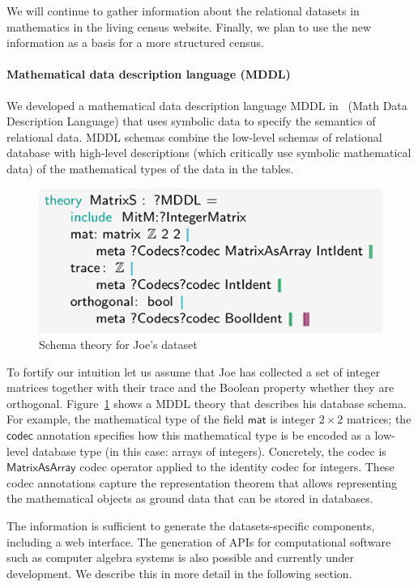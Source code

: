We will continue to gather information about the relational datasets 
in mathematics in the living census website.
Finally, we plan to use the new information as a basis for a more structured census.

\paragraph{Mathematical data description language (MDDL)}
We developed a mathematical data description language MDDL in~\cite{BerKohRab:tumdi19} (Math Data Description Language) that uses symbolic data to specify the semantics of relational data.
MDDL schemas combine the low-level schemas of relational database with high-level descriptions (which critically use symbolic mathematical data) of the mathematical types of the data in the tables.

\begin{figure}[ht]
  \includegraphics[width=.48\textwidth]{data_joe-schema}
  \caption{Schema theory for Joe's dataset}\label{fig:joe-schema}
\end{figure}

To fortify our intuition let us assume that Joe has collected a set of integer matrices together with their trace
and the Boolean property whether they are orthogonal.
Figure~\ref{fig:joe-schema} shows a MDDL theory that describes his database schema.
For example, the mathematical type of the field $\mathsf{mat}$ is integer $2\times2$ matrices;
the $\mathsf{codec}$ annotation specifies how this mathematical type is be encoded as a low-level database type (in this case: arrays of integers).
Concretely, the codec is $\mathsf{MatrixAsArray}$ codec operator applied to the identity codec for integers.
These codec annotations capture the representation theorem that allows representing the mathematical objects as ground data that can be stored in databases. 

The information is sufficient to generate the datasets-specific components,
including a web interface.
The generation of APIs for computational software such as computer algebra systems 
is also possible and currently under development.
We describe this in more detail in the following section.

